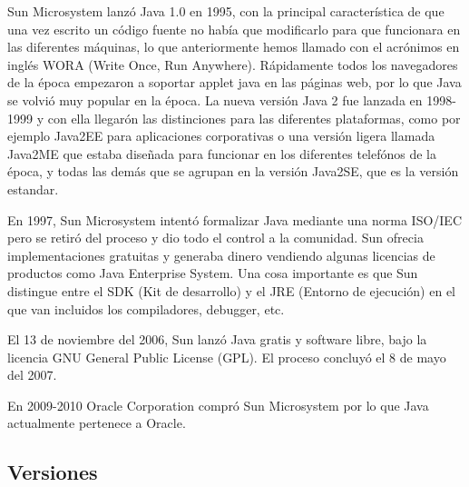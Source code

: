 Sun Microsystem lanzó Java 1.0 en 1995, con la principal característica de que una vez escrito un código fuente no había que modificarlo para que funcionara en las diferentes máquinas, lo que anteriormente hemos llamado con el acrónimos en inglés WORA (Write Once, Run Anywhere). Rápidamente todos los navegadores de la época empezaron a soportar applet java en las páginas web, por lo que Java se volvió muy popular en la época. La nueva versión Java 2 fue lanzada en 1998-1999 y con ella llegarón las distinciones para las diferentes plataformas, como por ejemplo Java2EE para aplicaciones corporativas o una versión ligera llamada Java2ME que estaba diseñada para funcionar en los diferentes telefónos de la época, y todas las demás que se agrupan en la versión Java2SE, que es la versión estandar.

En 1997, Sun Microsystem intentó formalizar Java mediante una norma ISO/IEC pero se retiró del proceso y dio todo el control a la comunidad. Sun ofrecia implementaciones gratuitas y generaba dinero vendiendo algunas licencias de productos como Java Enterprise System. Una cosa importante es que Sun distingue entre el SDK (Kit de desarrollo) y el JRE (Entorno de ejecución) en el que van incluidos los compiladores, debugger, etc.

El 13 de noviembre del 2006, Sun lanzó Java gratis y software libre, bajo la licencia GNU General Public License (GPL). El proceso concluyó el 8 de mayo del 2007.

En 2009-2010 Oracle Corporation compró Sun Microsystem por lo que Java actualmente pertenece a Oracle.

\subsection{Versiones}

